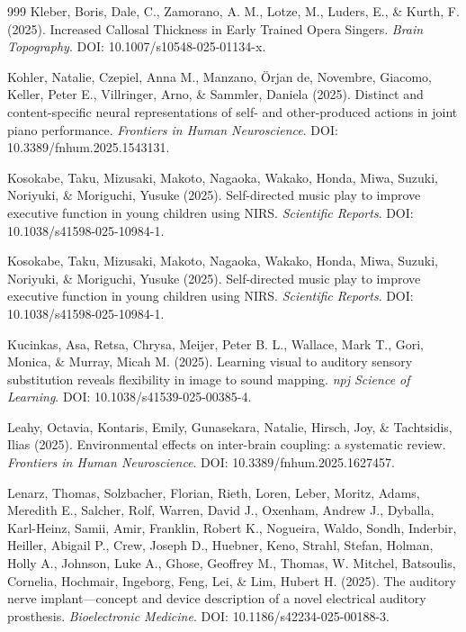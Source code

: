 \documentclass[9pt,onecolumn]{article}
\begin{document}
\begin{thebibliography}{999}
Kleber, Boris, Dale, C., Zamorano, A. M., Lotze, M., Luders, E., \& Kurth, F. (2025). Increased Callosal Thickness in Early Trained Opera Singers. \textit{Brain Topography}. DOI: 10.1007/s10548-025-01134-x.

Kohler, Natalie, Czepiel, Anna M., Manzano, Örjan de, Novembre, Giacomo, Keller, Peter E., Villringer, Arno, \& Sammler, Daniela (2025). Distinct and content-specific neural representations of self- and other-produced actions in joint piano performance. \textit{Frontiers in Human Neuroscience}. DOI: 10.3389/fnhum.2025.1543131.

Kosokabe, Taku, Mizusaki, Makoto, Nagaoka, Wakako, Honda, Miwa, Suzuki, Noriyuki, \& Moriguchi, Yusuke (2025). Self-directed music play to improve executive function in young children using NIRS. \textit{Scientific Reports}. DOI: 10.1038/s41598-025-10984-1.

Kosokabe, Taku, Mizusaki, Makoto, Nagaoka, Wakako, Honda, Miwa, Suzuki, Noriyuki, \& Moriguchi, Yusuke (2025). Self-directed music play to improve executive function in young children using NIRS. \textit{Scientific Reports}. DOI: 10.1038/s41598-025-10984-1.

Kucinkas, Asa, Retsa, Chrysa, Meijer, Peter B. L., Wallace, Mark T., Gori, Monica, \& Murray, Micah M. (2025). Learning visual to auditory sensory substitution reveals flexibility in image to sound mapping. \textit{npj Science of Learning}. DOI: 10.1038/s41539-025-00385-4.

Leahy, Octavia, Kontaris, Emily, Gunasekara, Natalie, Hirsch, Joy, \& Tachtsidis, Ilias (2025). Environmental effects on inter-brain coupling: a systematic review. \textit{Frontiers in Human Neuroscience}. DOI: 10.3389/fnhum.2025.1627457.

Lenarz, Thomas, Solzbacher, Florian, Rieth, Loren, Leber, Moritz, Adams, Meredith E., Salcher, Rolf, Warren, David J., Oxenham, Andrew J., Dyballa, Karl-Heinz, Samii, Amir, Franklin, Robert K., Nogueira, Waldo, Sondh, Inderbir, Heiller, Abigail P., Crew, Joseph D., Huebner, Keno, Strahl, Stefan, Holman, Holly A., Johnson, Luke A., Ghose, Geoffrey M., Thomas, W. Mitchel, Batsoulis, Cornelia, Hochmair, Ingeborg, Feng, Lei, \& Lim, Hubert H. (2025). The auditory nerve implant—concept and device description of a novel electrical auditory prosthesis. \textit{Bioelectronic Medicine}. DOI: 10.1186/s42234-025-00188-3.


\end{thebibliography}
\end{document}
